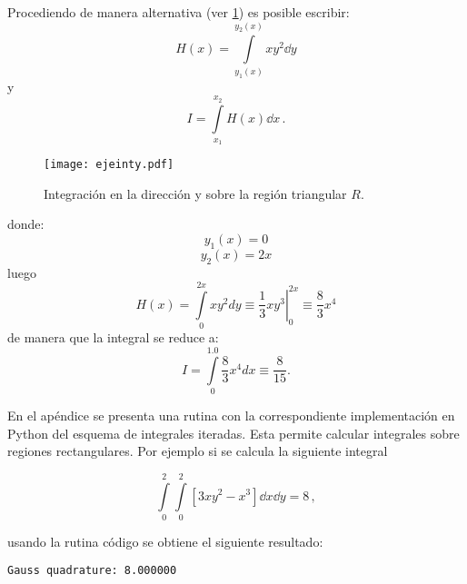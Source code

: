 
Procediendo de manera alternativa (ver \cref{fig:ejeinty}) es posible escribir:
\[H(x) = \int\limits_{y_1(x)}^{y_2(x)} x y^2 \dd{y} \]
y
\[I = \int\limits_{x_1}^{x_2} H(x) \dd{x}\, . \]

\begin{figure}[H]
\centering
\texttt{[image: ejeinty.pdf]}
\caption{Integración en la dirección y sobre la región triangular $R$.}
\label{fig:ejeinty}
\end{figure}
donde:
\[{y_1}(x) = 0\]
\[{y_2}(x) = 2x\]
luego
\[H(x) = \int\limits_0^{2x} {x{y^2}dy}  \equiv \left. {\frac{1}{3}x{y^3}} \right|_0^{2x} \equiv \frac{8}{3}{x^4}\]
de manera que la integral se reduce a:
\[I = \int\limits_0^{1.0} {\frac{8}{3}{x^4}dx}  \equiv \frac{8}{{15}}.\]

En el apéndice se presenta una rutina con la correspondiente implementación en 
Python del esquema de integrales iteradas. Esta permite calcular integrales 
sobre regiones rectangulares. Por ejemplo si se calcula la siguiente integral

\[\int\limits_0^2\int\limits_0^2 [3xy^2 - x^3] \dd{x}\dd{y} = 8\, , \]

usando la rutina código se obtiene el siguiente resultado:

\begin{verbatim}
Gauss quadrature: 8.000000
\end{verbatim}

\newpage
